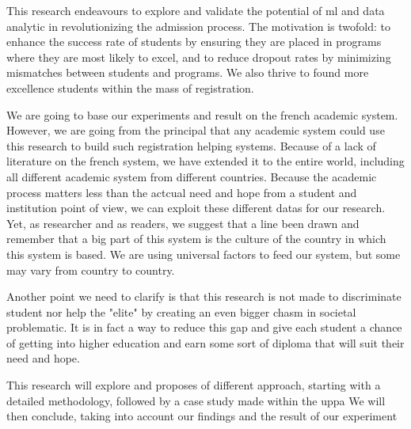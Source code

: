 \documentclass[../main.tex]{subfiles}
\begin{document}
This research endeavours to explore and validate the potential of \acrfull{ml} and data analytic in revolutionizing the admission process. The motivation is twofold: to enhance the success rate of students by ensuring they are placed in programs where they are most likely to excel, and to reduce dropout rates by minimizing mismatches between students and programs. We also thrive to found more excellence students within the mass of registration.

We are going to base our experiments and result on the french academic system. However, we are going from the principal that any academic system could use this research to build such registration helping systems. Because of a lack of literature on the french system, we have extended it to the entire world, including all different academic system from different countries. Because the academic process matters less than the actcual need and hope from a student and institution point of view, we can exploit these different datas for our research. Yet, as researcher and as readers, we suggest that a line been drawn and remember that a big part of this system is the culture of the country in which this system is based. We are using universal factors to feed our system, but some may vary from country to country.

Another point we need to clarify is that this research is not made to discriminate student nor help the "elite" by creating an even bigger chasm in societal problematic. It is in fact a way to reduce this gap and give each student a chance of getting into higher education and earn some sort of diploma that will suit their need and hope.

This research will explore and proposes of different approach, starting with a detailed methodology, followed by a case study made within the \acrfull{uppa}
We will then conclude, taking into account our findings and the result of our experiment 
\end{document}
